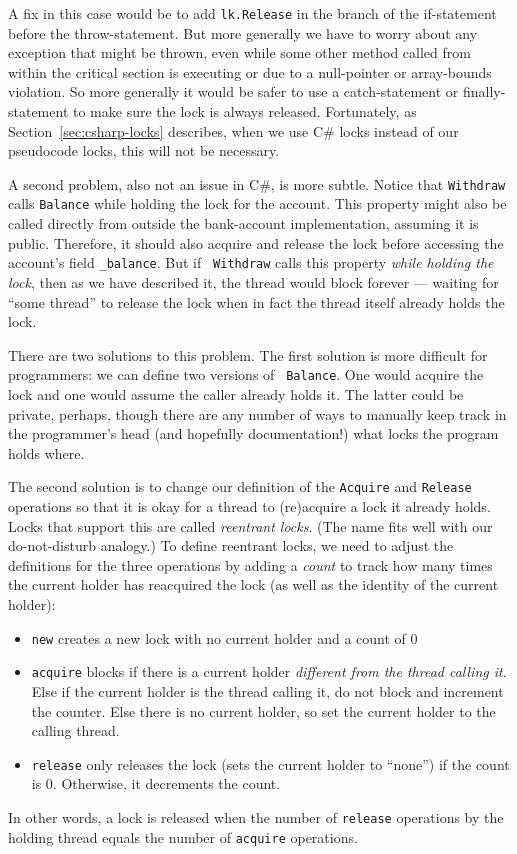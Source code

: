 \documentclass[10pt]{article}
\begin{document}
A fix in this case would be to add {\tt lk.Release} in the branch of
the if-statement before the throw-statement.  But more generally we
have to worry about any exception that might be thrown, even while
some other method called from within the critical section is executing
or due to a null-pointer or array-bounds violation.  So more generally
it would be safer to use a catch-statement or finally-statement to make
sure the lock is always released.  Fortunately, as
Section~\ref{sec:csharp-locks} describes, when we use C\# locks
instead of our pseudocode locks, this will not be necessary.

A second problem, also not an issue in C\#, is more subtle.  Notice
that {\tt Withdraw} calls {\tt Balance} while
holding the lock for the account.  This property might also be called
directly from outside the bank-account implementation, assuming it is 
public.  Therefore, it should also acquire and release the lock
before accessing the account's field {\tt \_balance}.  But if {\tt
  Withdraw} calls this property \emph{while holding the lock},
then as we have described it, the thread would block forever ---
waiting for ``some thread'' to release the lock when in fact the
thread itself already holds the lock.

There are two solutions to this problem.  The first solution is more
difficult for programmers: we can define two versions of {\tt
  Balance}.  One would acquire the lock and
one would assume the caller already holds it.  The latter could be
private, perhaps, though there are any number of ways to manually keep
track in the programmer's head (and hopefully documentation!) what
locks the program holds where.  

The second solution is to change our definition of the {\tt Acquire}
and {\tt Release} operations so that it is okay for a thread to
(re)acquire a lock it already holds.  Locks that support this are
called \emph{reentrant locks}.  (The name fits well with our
do-not-disturb analogy.) To define reentrant locks, we need to adjust
the definitions for the three operations by adding a \emph{count} to
track how many times the current holder has reacquired the lock (as
well as the identity of the current holder):
\begin{itemize}
\item {\tt new} creates a new lock with no current holder and a count
  of 0
\item {\tt acquire} blocks if there is a current holder
  \emph{different from the thread calling it}.  Else if the current holder
  is the thread calling it, do not block and increment the counter.
  Else there is no current holder, so set the current holder to the
  calling thread.
\item {\tt release} only releases the lock (sets the current holder to
  ``none'') if the count is 0.  Otherwise, it decrements the count.
\end{itemize}
In other words, a lock is released when the number of {\tt release}
operations by the holding thread equals the number of {\tt acquire}
operations.
\end{document}
